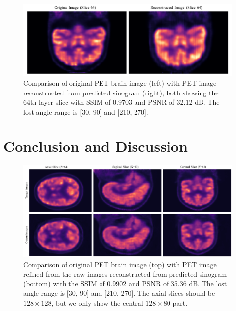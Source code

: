 \documentclass[aps,prb,preprint,groupedaddress,showkeys]{revtex4}
\begin{document}
\begin{figure}[ht]
    \centering
    \includegraphics[width=\textwidth]{Images/compare_reconstruction_restoration2}
    \vspace{-1cm}
    \caption{Comparison of original PET brain image (left) with PET image reconstructed from predicted sinogram (right), both showing the 64th layer slice with SSIM of 0.9703 and PSNR of 32.12 dB. The lost angle range is [30\degree, 90\degree] and [210\degree, 270\degree]. 
    }
    \label{fig:pet_brain_reconstruction}
\end{figure}


\section{Conclusion and Discussion}
\label{chap:conclusion}

\begin{figure}[ht]
    \centering
    \includegraphics[width=\textwidth]{Images/target_outputs.pdf}
    \vspace{-1cm}
    \caption{Comparison of original PET brain image (top) with PET image refined from the raw images reconstructed from predicted sinogram (bottom) with the SSIM of 0.9902 and PSNR of 35.36 dB. The lost angle range is [30\degree, 90\degree] and [210\degree, 270\degree]. The axial slices should be $128\times128$, but we only show the central $128\times80$ part. 
    }
    \label{fig:compare_reconstruction_restoration}
\end{figure}
\end{document}
